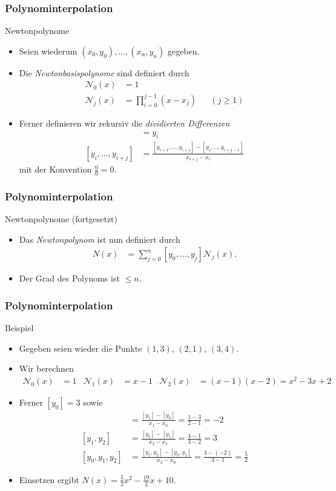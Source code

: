 \documentclass{beamer}
\renewcommand{\emph}[1]{{\textcolor{solarizedRed}{\itshape #1}}}
\newcommand\cN{\mathcal N}
\newcommand{\mytitle}{Polynominterpolation}
\begin{document}
\begin{frame}\frametitle{\mytitle}
	\begin{block}{Newtonpolynome}
		\begin{itemize}
			\item Seien wiederum $(x_0,y_0),\ldots,(x_n,y_n)$ gegeben.
			\item Die \emph{Newtonbasispolynome} sind definiert durch
				\begin{align*}
					\cN_0(x)&=1\\
					\cN_j(x)&=\prod_{i=0}^{j-1}(x-x_j)&&(j\geq1)
				\end{align*}
			\item Ferner definieren wir rekursiv die \emph{dividierten Differenzen}
				\begin{align*}
					[y_i]&=y_i\\
					[y_i,\ldots,y_{i+j}]&=\frac{[y_{i+1},\ldots,y_{i+j}]-[y_i,\ldots,y_{i+j-1}]}{x_{i+j}-x_i}
				\end{align*}
				mit der Konvention $\frac{0}{0}=0$.
		\end{itemize}
	\end{block}
\end{frame}

\begin{frame}\frametitle{\mytitle}
	\begin{block}{Newtonpolynome (fortgesetzt)}
		\begin{itemize}
			\item Das \emph{Newtonpolynom} ist nun definiert durch
				\begin{align*}
					N(x)&=\sum_{j=0}^n[y_0,\ldots,y_j]\cN_j(x).
				\end{align*}
			\item Der Grad des Polynoms ist $\leq n$.
		\end{itemize}
	\end{block}
\end{frame}

\begin{frame}\frametitle{\mytitle}
	\begin{block}{Beispiel}
		\begin{itemize}
			\item Gegeben seien wieder die Punkte $(1,3)$, $(2,1)$, $(3,4)$.
			\item Wir berechnen
				\begin{align*}
					\cN_0(x)&=1&
					\cN_1(x)&=x-1&
					\cN_2(x)&=(x-1)(x-2)=x^2-3x+2
				\end{align*}
			\item Ferner $[y_0]=3$ sowie
				\begin{align*}
					[y_0,y_1]&=\frac{[y_1]-[y_0]}{x_1-x_0}=\frac{1-3}{2-1}=-2\\
					[y_1,y_2]&=\frac{[y_2]-[y_1]}{x_2-x_1}=\frac{4-1}{3-2}=3\\
					[y_0,y_1,y_2]&=\frac{[y_1,y_2]-[y_0,y_1]}{x_2-x_0}=\frac{3-(-2)}{3-1}=\frac{5}{2}
				\end{align*}
			\item Einsetzen ergibt $N(x)=\frac{5}{2}x^2-\frac{19}{2}x+10$.
		\end{itemize}
	\end{block}
\end{frame}
\end{document}
